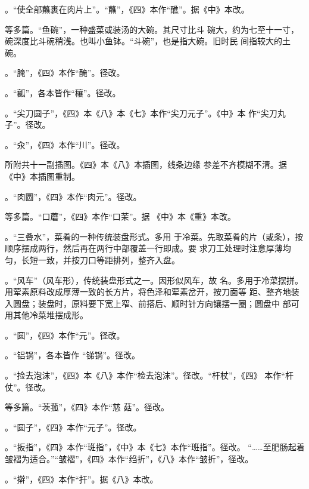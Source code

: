 \begin{list}{}
。“使全部蘸裹在肉片上”。“蘸”，《四》本作“醮”。据《中》本改。

等多篇。“鱼碗”，一种盛菜或装汤的大碗。其尺寸比斗
碗大，约为七至十一寸，碗深度比斗碗稍浅。也叫小鱼钵。“斗碗”，也是指大碗。旧时民
间指较大的土碗。

。“腌”，《四》本作“醃”。径改。

。“瓤”，各本皆作“穰”。径改。

。“尖刀圆子”，《四》本《八》本《七》本作“尖刀元子”。《中》本
作“尖刀丸子”。径改。

。“汆”，《四》本作“川”。径改。

所附共十一副插图。《四》本《八》本插图，线条边缘
参差不齐模糊不清。据《中》本插图重制。

。“肉圆”，《四》本作“肉元”。径改。

等多篇。“口蘑”，《四》本作“口茉”。据
《中》本《重》本改。

。“三叠水”，菜肴的一种传统装盘形式。多用
于冷菜。先取菜肴的片（或条），按顺序摆成两行，然后再在两行中部覆盖一行即成。要
求刀工处理时注意厚薄均匀，长短一致，并按刀口等距排列，整齐入盘。

。“风车”（风车形），传统装盘形式之一。因形似风车，故
名。多用于冷菜摆拼。用荤素原料改成厚薄一致的长方片，将色泽和荤素岔开，按刀面等
距、整齐地装入圆盘；装盘时，原料要下宽上窄、前搭后、顺时针方向镶摆一圈；圆盘中
部可用其他冷菜堆摆成形。

。“圆”，《四》本作“元”。径改。

。“铝锅”，各本皆作
“锑锅”。\xeCJKnobreak{}径改。

。“捡去泡沫”，《四》本《八》本作“检去泡沫”。径改。“杆杖”，《四》
本作“杆仗”。径改。

等多篇。“茨菰”，《四》本作“慈
菇”。径改。

。“圆子”，《四》本作“元子”。径改。

。“扳指”，《四》本作“斑指”，《中》本《七》本作“班指”。径改。
“……至肥肠起着皱褶为适合。”“皱褶”，《四》本作“绉折”，《八》本作“皱折”，径改。

。“擀”，《四》本作“扞”。据《八》本改。


\end{list}
